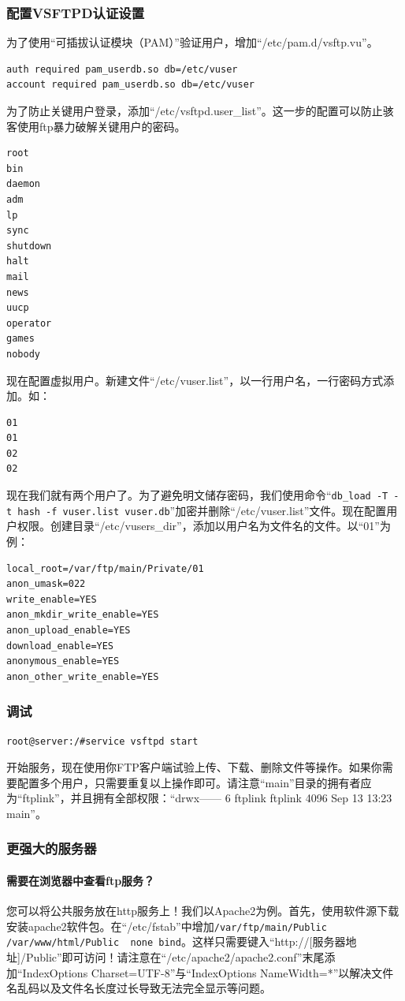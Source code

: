 \subsubsection{配置VSFTPD认证设置}
为了使用“可插拔认证模块（PAM）”验证用户，增加“/etc/pam.d/vsftp.vu”。
\begin{verbatim}
auth required pam_userdb.so db=/etc/vuser
account required pam_userdb.so db=/etc/vuser
\end{verbatim}
为了防止关键用户登录，添加“/etc/vsftpd.user\_list”。这一步的配置可以防止骇客使用ftp暴力破解关键用户的密码。
\begin{verbatim}
root
bin
daemon
adm
lp
sync
shutdown
halt
mail
news
uucp
operator
games
nobody
\end{verbatim}\par
现在配置虚拟用户。新建文件“/etc/vuser.list”，以一行用户名，一行密码方式添加。如：
\begin{verbatim}
01
01
02
02
\end{verbatim}\par
现在我们就有两个用户了。为了避免明文储存密码，我们使用命令“\verb|db_load -T -t hash -f vuser.list vuser.db|”加密并删除“/etc/vuser.list”文件。现在配置用户权限。创建目录“/etc/vusers\_dir”，添加以用户名为文件名的文件。以“01”为例：
\begin{verbatim}
local_root=/var/ftp/main/Private/01
anon_umask=022
write_enable=YES
anon_mkdir_write_enable=YES
anon_upload_enable=YES
download_enable=YES
anonymous_enable=YES
anon_other_write_enable=YES
\end{verbatim}
\subsubsection{调试}
\begin{verbatim}
root@server:/#service vsftpd start
\end{verbatim}\par
开始服务，现在使用你FTP客户端试验上传、下载、删除文件等操作。如果你需要配置多个用户，只需要重复以上操作即可。请注意“main”目录的拥有者应为“ftplink”，并且拥有全部权限：“drwx------  6 ftplink ftplink 4096 Sep 13 13:23 main”。
\subsubsection{更强大的服务器}
\paragraph{需要在浏览器中查看ftp服务？}您可以将公共服务放在http服务上！我们以Apache2为例。首先，使用软件源下载安装apache2软件包。在“/etc/fstab”中增加\verb|/var/ftp/main/Public /var/www/html/Public  none bind|。这样只需要键入“http://[服务器地址]/Public”即可访问！请注意在“/etc/apache2/apache2.conf”末尾添加“IndexOptions Charset=UTF-8”与“IndexOptions NameWidth=*”以解决文件名乱码以及文件名长度过长导致无法完全显示等问题。
